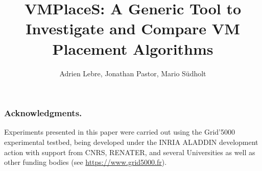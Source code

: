\documentclass[runningheads,a4paper]{llncs2e/llncs}
\begin{document}
\title{VMPlaceS: A Generic Tool to Investigate and Compare VM Placement Algorithms}
%
%
\author{Adrien Lebre, Jonathan Pastor, Mario S\"udholt}
%


\maketitle






%
%

%

\subsubsection{Acknowledgments.}
Experiments presented in this paper were carried out using the Grid'5000 experimental
testbed, being developed under the INRIA ALADDIN development action with support from
CNRS, RENATER, and several Universities as well as other funding bodies (see
\url{https://www.grid5000.fr}).



\end{document}
